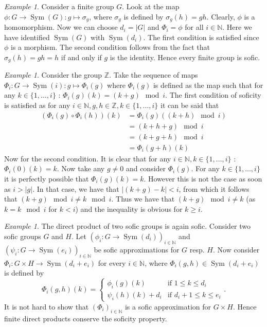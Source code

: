 \documentclass[titlepage, a4paper]{article}
\newcommand{\N}{\mathbb{N}}
\newcommand{\Z}{\mathbb{Z}}
\newcommand{\card}[1]{\left| #1 \right|}
\DeclareMathOperator{\sym}{Sym}
\theoremstyle{remark}
\newtheorem{example}[theorem]{Example}
\begin{document}
    \begin{example}\label{ex:finite_group_sofic}
    Consider a finite group $G$. Look at the map $\phi: G \to \sym(G): g \mapsto \sigma_g$, where $\sigma_g$ is defined by $\sigma_g(h) = gh$. Clearly, $\phi$ is a homomorphism. Now we can choose $d_i = \card G$ and $\Phi_i = \phi$ for all $i \in \N$. Here we have identified $\sym(G)$ with $\sym(d_i)$. The first condition is satisfied since $\phi$ is a morphism. The second condition follows from the fact that $\sigma_g(h) = gh = h$ if and only if $g$ is the identity.
     Hence every finite group is sofic.
    \end{example}


	\begin{example}\label{ex:Z}
	Consider the group $\Z$. Take the sequence of maps $\Phi_{i}: G \to \sym(i): g \mapsto \Phi_{i}(g)$ where $\Phi_{i}(g)$ is defined as the map such that for any $k \in \{1,\dots,i\}$ : $ \Phi_{i}(g)(k) = (k+g) \mod i$. The first condition of soficity is satisfied as for any $i \in \N, g,h \in \Z, k \in \{1,\dots, i\}$ it can be said that 
	\begin{align*}
	(\Phi_{i}(g) \circ \Phi_{i}(h))(k) &= \Phi_{i}(g)((k+h)\mod i )\\
	&= (k+h+g)\mod i \\
	&= (k+g+h)\mod i \\
	&= \Phi_{i}(g+h)(k)
\end{align*}		
Now for the second condition. It is clear that for any $i \in \N, k \in \{1,\dots, i\}$ : $\Phi_{i}(0)(k) = k$. Now take any $g \neq 0$ and consider $\Phi_{i}(g)$. For any $k \in \{1,\dots,i\}$ it is perfectly possible that $\Phi_{i}(g)(k) = k$. However this is not the case as soon as $i > |g|$. In that case, we have that $|(k+g)-k| < i$, from which it follows that $(k+g)\mod i \neq k \mod i$. Thus we have that $(k+g)\mod i \neq k$ (as $k = k\mod i$ for $k<i$) and the inequality is obvious for $k \geq i$.  %
	\end{example}

    \begin{example}\label{ex:direct_product_sofic}
        The direct product of two sofic groups is again sofic. Consider two sofic groups $G$ and $H$. Let $(\phi_i: G \to \sym(d_i))_{i \in \N}$ and $(\psi_i: G \to \sym(e_i))_{i \in \N}$ be sofic approximations for $G$ resp. $H$. Now consider $\Phi_i : G \times H \to \sym(d_i+e_i)$ for every $i \in \N$, where $\Phi_i(g, h) \in \sym(d_i+e_i)$ is defined by
        \[
            \Phi_i(g,h)(k) = \begin{cases} \phi_i(g)(k) & \text{if } 1 \leq k \leq d_i \\
            \psi_i(h)(k)+d_i & \text{if } d_i + 1 \leq k \leq e_i
            \end{cases}.
        \]
        It is not hard to show that $(\Phi_i)_{i \in \N}$ is a sofic approximation for $G \times H$. %
	Hence finite direct products conserve the soficity property. 
    \end{example}
\end{document}
